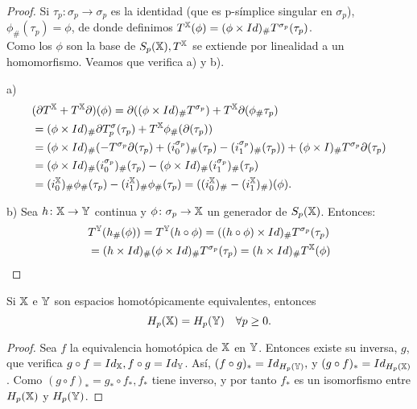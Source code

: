 \begin{proof}
  Si $\tau_p \colon \sigma_p \to \sigma_p$ es la identidad (que es p-símplice singular en $\sigma_p$), $\phi_\#(\tau_p) = \phi$,
  de donde definimos $T^{\mathbb X}(\phi) = (\phi \times Id)_\# T^{\sigma_p}(\tau_p)$. \\
  Como los $\phi$ son la base de $S_{p}({\mathbb X}), T^{\mathbb X}$ se extiende por linealidad a un homomorfismo. Veamos que verifica a) y b).

  a)
  \begin{align*}
    &(\partial T^{\mathbb X} + T^{\mathbb X} \partial)(\phi) = \partial((\phi \times Id)_\# T^{\sigma_p}) + T^{\mathbb X} \partial(\phi_\# \tau_p) \\
    &= (\phi \times Id)_\# \partial T^\sigma_p(\tau_p) + T^{\mathbb X} \phi_\#(\partial(\tau_p)) \\
    &= (\phi \times Id)_\# (- T^{\sigma_p} \partial(\tau_p) + (i_0^{\sigma_p})_\# (\tau_p) - (i_1^{\sigma_p})_\# (\tau_p)) + (\phi \times I)_\# T^{\sigma_p}\partial(\tau_p) \\
    &= (\phi \times Id)_\# (i_0^{\sigma_p})_\#(\tau_p) - (\phi \times Id)_\# (i_1^{\sigma_p})_\#(\tau_p) \\
    &= (i_0^{\mathbb X})_\# \phi_\#(\tau_p) - (i_1^{\mathbb X})_\# \phi_\#(\tau_p) = ((i_0^{\mathbb X})_\# - (i_1^{\mathbb X})_\#) (\phi).
  \end{align*}

  b) Sea $h\colon {\mathbb X} \to {\mathbb Y}$ continua y $\phi \colon \sigma_p \to {\mathbb X}$ un generador de $S_{p}({\mathbb X})$. Entonces:
  \begin{align*}
    &T^{\mathbb Y}(h_\#(\phi)) = T^{\mathbb Y}(h \circ \phi) = ((h \circ \phi) \times Id)_\# T^{\sigma_p}(\tau_p) \\
    &= (h \times Id)_\# (\phi \times Id)_\# T^{\sigma_p} (\tau_p) = (h \times Id)_\# T^{\mathbb X}(\phi)
  \end{align*}
\end{proof}

\begin{corollary}
  Si ${\mathbb X}$ e ${\mathbb Y}$ son espacios homotópicamente equivalentes, entonces \[H_p({\mathbb X}) = H_p({\mathbb Y}) \quad \forall p \geq 0.\]
\end{corollary}

\begin{proof}
  Sea $f$ la equivalencia homotópica de ${\mathbb X}$ en ${\mathbb Y}$. Entonces existe su inversa, $g$, que verifica $g \circ f = Id_{\mathbb X}, f \circ g = Id_{\mathbb Y}$.
  Así, $(f \circ g)_* = Id_{H_p({\mathbb Y})},$ y $(g \circ f)_* = Id_{H_p({\mathbb X})}$. Como $(g \circ f)_* = g_* \circ f_*, f_*$ tiene inverso, y por tanto
  $f_*$ es un isomorfismo entre $H_p({\mathbb X})$ y $H_p({\mathbb Y})$.
\end{proof}

